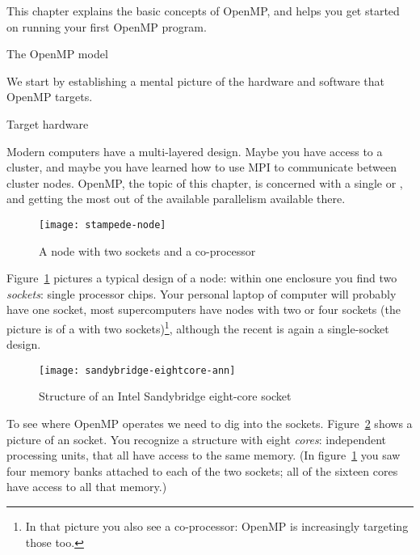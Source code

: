 
This chapter explains the basic concepts of OpenMP, and helps you get
started on running your first OpenMP program.

 {The OpenMP model}

We start by establishing a mental picture of the hardware and software
that OpenMP targets.

 {Target hardware}

Modern computers have a multi-layered design. Maybe you have access to
a cluster, and maybe you have learned how to use MPI to communicate
between cluster nodes. OpenMP, the topic of this chapter, is concerned
with a single  or ,
and getting the most out of the available parallelism available there.

\begin{figure}[ht]
\texttt{[image: stampede-node]}
\caption{A node with two sockets and a co-processor}
\label{fig:stampedenode}
\end{figure}
%
Figure~\ref{fig:stampedenode} pictures a typical design of a node:
within one enclosure you find two \emph{sockets}:
single processor chips. Your personal laptop of computer will probably
have one socket, most supercomputers have nodes with two or four
sockets (the picture is of a  with two
sockets)\footnote {In that picture you also see a co-processor: OpenMP
  is increasingly targeting those too.}, although the recent
 is again a single-socket
design.

\begin{figure}[ht]
  \texttt{[image: sandybridge-eightcore-ann]}
  \caption{Structure of an Intel Sandybridge eight-core socket}
  \label{fig:sandybridge}
\end{figure}
%
To see where OpenMP operates we need to dig into the
sockets. Figure~\ref{fig:sandybridge} shows a picture of an
 socket. You recognize a structure
with eight \emph{cores}: independent processing
units, that all have access to the same memory. (In
figure~\ref{fig:stampedenode} you saw four memory banks attached to
each of the two sockets; all of the sixteen cores have access to all
that memory.)

